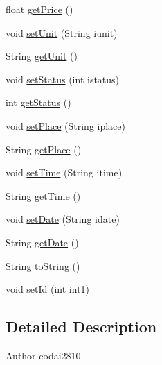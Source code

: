 \begin{DoxyCompactItemize}
\item 
float \hyperlink{classvip2012_1_1g07_1_1shoppinglist_1_1Item_a468a3c13f380186f4c1ece14fa1d81b4}{get\-Price} ()
\item 
void \hyperlink{classvip2012_1_1g07_1_1shoppinglist_1_1Item_a8faa4542fe3e3ea454b31834428e07a0}{set\-Unit} (String iunit)
\item 
String \hyperlink{classvip2012_1_1g07_1_1shoppinglist_1_1Item_a6d4d111b97ef0783982e0faed94ec4dd}{get\-Unit} ()
\item 
void \hyperlink{classvip2012_1_1g07_1_1shoppinglist_1_1Item_ac4fbd66028ac6e5b7add443b0312a05f}{set\-Status} (int istatus)
\item 
int \hyperlink{classvip2012_1_1g07_1_1shoppinglist_1_1Item_add03c73583d9e0199a6bc8d2c1ca1267}{get\-Status} ()
\item 
void \hyperlink{classvip2012_1_1g07_1_1shoppinglist_1_1Item_ae91940cd4dd19d11851f3d2be8d27447}{set\-Place} (String iplace)
\item 
String \hyperlink{classvip2012_1_1g07_1_1shoppinglist_1_1Item_a5c29e7a6abded44e109539782f479ff0}{get\-Place} ()
\item 
void \hyperlink{classvip2012_1_1g07_1_1shoppinglist_1_1Item_a30904a8747453fce947be54059dac795}{set\-Time} (String itime)
\item 
String \hyperlink{classvip2012_1_1g07_1_1shoppinglist_1_1Item_a900d6e82e989377b86cd1d6491a50180}{get\-Time} ()
\item 
void \hyperlink{classvip2012_1_1g07_1_1shoppinglist_1_1Item_a2146a4bd71bdf972a6987a458c4c6c26}{set\-Date} (String idate)
\item 
String \hyperlink{classvip2012_1_1g07_1_1shoppinglist_1_1Item_acc20fcd26ddd99b881506aa2ac5d771d}{get\-Date} ()
\item 
String \hyperlink{classvip2012_1_1g07_1_1shoppinglist_1_1Item_a753617f235595034b888c8789a263a5c}{to\-String} ()
\item 
void \hyperlink{classvip2012_1_1g07_1_1shoppinglist_1_1Item_af5c4866d94939c403a91ba49f2b6d621}{set\-Id} (int int1)
\end{DoxyCompactItemize}


\subsection{Detailed Description}
\begin{DoxyAuthor}{Author}
codai2810 
\end{DoxyAuthor}


